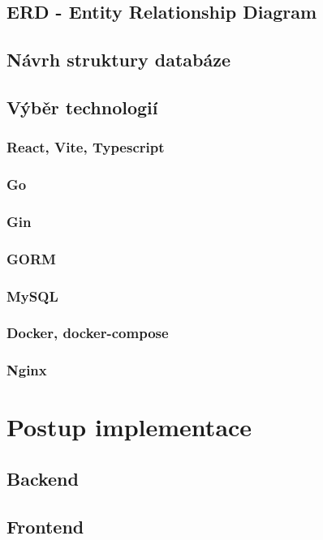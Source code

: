 \documentclass[14pt,a4paper]{article}
\begin{document}
        \subsection{ERD - Entity Relationship Diagram}
        \subsection{Návrh struktury databáze}
        \subsection{Výběr technologií}
            \subsubsection{React, Vite, Typescript}
            \subsubsection{Go}
            \subsubsection{Gin}
            \subsubsection{GORM}
            \subsubsection{MySQL}
            \subsubsection{Docker, docker-compose}
            \subsubsection{Nginx}
	
	\section{Postup implementace}
        \subsection{Backend}
        \subsection{Frontend}
\end{document}
